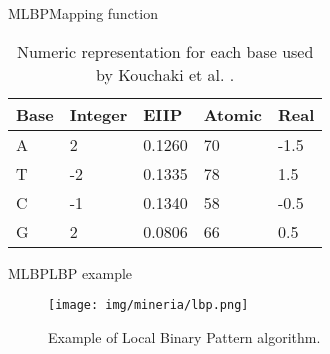 \documentclass[10pt]{beamer}
\newcommand{\1}{
	\setbeamertemplate{background}{
		\texttt{[image: img/1]}
		\tikz[overlay] \fill[fill opacity=0.75,fill=white] (0,0) rectangle (-\paperwidth,\paperheight);
	}
}
\begin{document}
\begin{frame}{MLBP}{Mapping function}
	\begin{table}[h]
		\centering
		\caption{Numeric representation for each base used by Kouchaki et al. \cite{kouchaki2019signal}.}
		\label{tab:chen_numeric}
		\setlength{\tabcolsep}{0.5em} %
		{\renewcommand{\arraystretch}{1}%
			\begin{tabular}{lllll}
				\hline
				Base           	&  Integer & EIIP & Atomic  & Real \\ \hline
				A      			& 2 & 0.1260 & 70 & -1.5 \\ 
				T          	   	& -2 & 0.1335 & 78 & 1.5 \\ 
				C      			& -1 & 0.1340 & 58 & -0.5 \\ 
				G				& 2 & 0.0806 & 66 & 0.5 \\ \hline
			\end{tabular}
		}
	\end{table}
\end{frame}

\begin{frame}{MLBP}{LBP example}
	\begin{figure}[]
		\centering
		\texttt{[image: img/mineria/lbp.png]}
		\label{img:mot2}
		\caption{Example of Local Binary Pattern algorithm. }
	\end{figure}
\end{frame}
\end{document}
